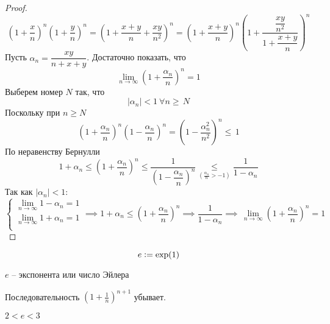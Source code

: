 \begin{proof}
\begin{equation*}
        \left(1 + \dfrac{x}{n}\right)^n\left(1 + \dfrac{y}{n}\right)^n = \left( 1 + \dfrac{x + y}{n} + \dfrac{xy}{n^2}  \right)^n = \left(1 + \dfrac{x + y}{n} \right)^n\left(1 + \dfrac{\dfrac{xy}{n^2} }{1 + \dfrac{x + y}{n} }\right)^ n
    \end{equation*}
    Пусть $ \alpha_n = \dfrac{xy}{n + x + y}  $. Достаточно показать, что \begin{equation*}
        \lim_{n \to \infty}\left(1 + \frac{\alpha_n}{n} \right)^n = 1
    \end{equation*}
    Выберем номер $ N $ так, что \begin{equation*}
        |\alpha_n| < 1 \:\forall n \geq\, N
    \end{equation*}
    Поскольку при $ n \geq N $ \begin{equation*}
        \left(1 + \frac{\alpha_n}{n} \right)^n\left(1 - \frac{\alpha_n}{n} \right)^n = \left(1 - \dfrac{\alpha_n^2}{n^2} \right)^n \leq\, 1
    \end{equation*}
    По неравенству Бернулли \begin{equation*}
        1 + \alpha_n  \leq \left(1 + \dfrac{\alpha_n}{n} \right)^n \leq \dfrac{1}{\left(1 - \dfrac{\alpha_n}{n}\right)^n} \underset{\left(\frac{\alpha_n}{n} > - 1\right)}{ \leq }\dfrac{1}{1 - \alpha_n}
    \end{equation*}
    Так как $ |\alpha_n| < 1 $:
    \begin{equation*}
    \begin{cases}
        \lim_{n \to \infty}1 - \alpha_n = 1 \\
        \lim_{n \to \infty}1 + \alpha_n = 1 \\
    \end{cases} \implies 1 + \alpha_n \leq \left(1 + \dfrac{\alpha_n}{n}\right)^n \implies \dfrac{1}{1 - \alpha_n} \implies\,\lim_{n \to \infty}\left(1 + \dfrac{\alpha_n}{n}\right)^n = 1 
   \end{equation*}
\end{proof}

\begin{equation}
    e \vcentcolon= \exp(1)
\end{equation}

$e$ -- экспонента или число Эйлера

\begin{theorem}
    Последовательность $\left(1 + \frac{1}{n}\right)^{n + 1}$ убывает.    
\end{theorem}

\begin{theorem}
    $2 < e < 3$
\end{theorem}


